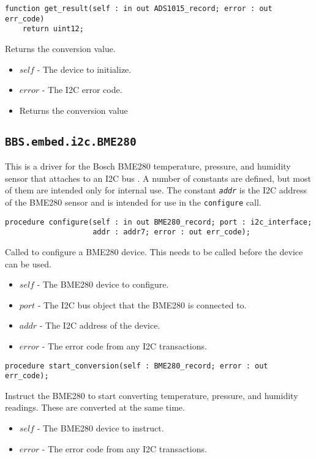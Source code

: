 \documentclass[10pt, openany]{book}
\newcommand{\package}[1]{\texttt{#1}}
\newcommand{\function}[1]{\texttt{#1}}
\newcommand{\constant}[1]{\emph{\texttt{#1}}}
\begin{document}
\begin{lstlisting}
function get_result(self : in out ADS1015_record; error : out err_code)
    return uint12;
\end{lstlisting}
Returns the conversion value.
\begin{itemize}
  \item $self$ - The device to initialize.
  \item $error$ - The I2C error code.
  \item Returns the conversion value
\end{itemize}

\subsection{\package{BBS.embed.i2c.BME280}}
This is a driver for the Bosch BME280 temperature, pressure, and humidity sensor that attaches to an I2C bus \cite{BME280}.  A number of constants are defined, but most of them are intended only for internal use.  The constant \constant{addr} is the I2C address of the BME280 sensor and is intended for use in the \function{configure} call.

\begin{lstlisting}
procedure configure(self : in out BME280_record; port : i2c_interface;
                    addr : addr7; error : out err_code);
\end{lstlisting}
Called to configure a BME280 device.  This needs to be called before the device can be used.
\begin{itemize}
  \item $self$ - The BME280 device to configure.
  \item $port$ - The I2C bus object that the BME280 is connected to.
  \item $addr$ - The I2C address of the device.
  \item $error$ - The error code from any I2C transactions.
\end{itemize}

\begin{lstlisting}
procedure start_conversion(self : BME280_record; error : out err_code);
\end{lstlisting}
Instruct the BME280 to start converting temperature, pressure, and humidity readings.  These are converted at the same time.
\begin{itemize}
  \item $self$ - The BME280 device to instruct.
  \item $error$ - The error code from any I2C transactions.
\end{itemize}
\end{document}
